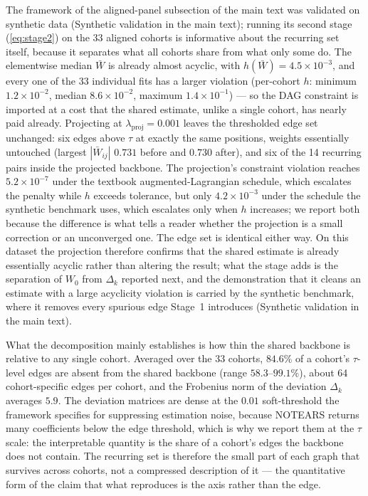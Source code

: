 \documentclass[11pt]{article}
\begin{document}
The framework of the aligned-panel subsection of the main text was validated on synthetic data (Synthetic validation in the main text); running its second stage (\ref{eq:stage2}) on the 33 aligned cohorts is informative about the recurring set itself, because it separates what all cohorts share from what only some do. The elementwise median $\bar{W}$ is already almost acyclic, with $h(\bar{W}) = 4.5 \times 10^{-3}$, and every one of the 33 individual fits has a larger violation (per-cohort $h$: minimum $1.2 \times 10^{-2}$, median $8.6 \times 10^{-2}$, maximum $1.4 \times 10^{-1}$) --- so the DAG constraint is imported at a cost that the shared estimate, unlike a single cohort, has nearly paid already. Projecting at $\lambda_{\mathrm{proj}} = 0.001$ leaves the thresholded edge set unchanged: six edges above $\tau$ at exactly the same positions, weights essentially untouched (largest $|\bar{W}_{ij}|$ $0.731$ before and $0.730$ after), and six of the 14 recurring pairs inside the projected backbone. The projection's constraint violation reaches $5.2 \times 10^{-7}$ under the textbook augmented-Lagrangian schedule, which escalates the penalty while $h$ exceeds tolerance, but only $4.2 \times 10^{-3}$ under the schedule the synthetic benchmark uses, which escalates only when $h$ increases; we report both because the difference is what tells a reader whether the projection is a small correction or an unconverged one. The edge set is identical either way. On this dataset the projection therefore confirms that the shared estimate is already essentially acyclic rather than altering the result; what the stage adds is the separation of $W_0$ from $\Delta_k$ reported next, and the demonstration that it cleans an estimate with a large acyclicity violation is carried by the synthetic benchmark, where it removes every spurious edge Stage~1 introduces (Synthetic validation in the main text).

What the decomposition mainly establishes is how thin the shared backbone is relative to any single cohort. Averaged over the 33 cohorts, $84.6\%$ of a cohort's $\tau$-level edges are absent from the shared backbone (range $58.3$--$99.1\%$), about 64 cohort-specific edges per cohort, and the Frobenius norm of the deviation $\Delta_k$ averages $5.9$. The deviation matrices are dense at the $0.01$ soft-threshold the framework specifies for suppressing estimation noise, because NOTEARS returns many coefficients below the edge threshold, which is why we report them at the $\tau$ scale: the interpretable quantity is the share of a cohort's edges the backbone does not contain. The recurring set is therefore the small part of each graph that survives across cohorts, not a compressed description of it --- the quantitative form of the claim that what reproduces is the axis rather than the edge.
\end{document}
